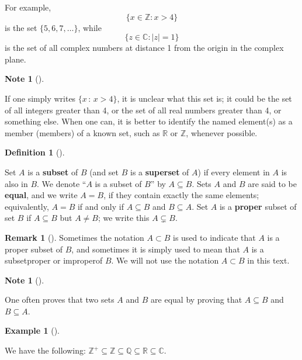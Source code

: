 \documentclass[10pt,]{book}
\newcommand{\terminology}[1]{\textbf{#1}}
\theoremstyle{plain}
\theoremstyle{definition}
\newtheorem{definition}[theorem]{Definition}
\theoremstyle{definition}
\newtheorem{remark}[theorem]{Remark}
\newtheorem{note}[theorem]{Note}
\theoremstyle{definition}
\newtheorem{example}[theorem]{Example}
\theoremstyle{definition}
\numberwithin{equation}{section}
\def\Z{\mathbb{Z}}
\def\R{\mathbb{R}}
\def\Q{\mathbb{Q}}
\def\C{\mathbb{C}}
\begin{document}
    For example, %
\begin{equation*}
 \{x\in \Z : x > 4\} 
\end{equation*}
 is the set \(\{5, 6, 7, \ldots\}\), while %
\begin{equation*}
 \{z\in \C : |z|=1\}
\end{equation*}
 is the set of all complex numbers at distance 1 from the origin in the complex plane.
\begin{note}[]\label{note-2}

    If one simply writes \(\{x\,:\,x>4\}\),
    it is unclear what this set is; it could be the set of all
    integers greater than 4, or the set of all real numbers greater
    than 4, or something else. When one can, it is better to
    identify the named element(s) as a member (members) of a known
    set, such as \(\R\) or \(\Z\), whenever possible.
\end{note}
\begin{definition}[{}]\label{definition-4}

        Set \(A\) is a \terminology{subset} of \(B\) (and set \(B\) is a \terminology{superset} of \(A\)) if every element in \(A\) is also in \(B\). We
        denote ``\(A\) is a subset of \(B\)'' by \(A\subseteq B\). Sets \(A\)
        and \(B\) are said to be \terminology{equal}, and we write \(A=B\), if they
        contain exactly the same elements; equivalently, \(A=B\) if and
        only if \(A \subseteq B\) and \(B\subseteq A\). Set \(A\) is a \terminology{proper} subset of set \(B\) if \(A\subseteq B\) but \(A\neq B\); we
        write this \(A\subsetneq B\).
\label{notation-14}
\label{notation-15}
\end{definition}
\begin{remark}[]\label{remark-1}
 Sometimes the notation \(A\subset B\) is  used to
        indicate that \(A\) is a proper subset of \(B\), and sometimes it is simply used to mean that \(A\) is a subset\textemdash{}proper or improper\textemdash{}of \(B\). We will not use the notation \(A \subset B\) in this text. %
\end{remark}
\begin{note}[]\label{note-3}

      One often proves that two sets \(A\) and
      \(B\) are equal by proving that \(A\subseteq B\) and \(B\subseteq A\).
\end{note}
\begin{example}[]\label{example-2}

        We have the following: \(\Z^+ \subseteq \Z \subseteq \Q \subseteq \R \subseteq \C\).
\end{example}
\end{document}
